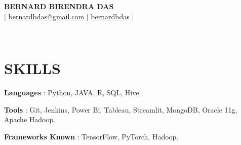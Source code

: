 \documentclass[letterpaper, 10pt]{article}
\begin{document}
\begin{center}
    \textbf{\Large\scshape BERNARD BIRENDRA DAS} \\ \vspace{2pt}
    \small {} $|$ 
    \faEnvelope \hspace{2pt} \href{mailto:bernardbdas@gmail.com}{\color{black} \underline {bernardbdas@gmail.com}} $|$ 
    \faLinkedin \hspace{2pt}\href{www.linkedin.com/in/bernardbdas/} {\color{black} \underline{bernardbdas}} \hspace{1pt} $|$ 
    \address{  Kolkata, West Bengal}\\
\end{center}
\vspace{-15pt}

\section{SKILLS}
\begin{itemize}[leftmargin=0in, label={}]
\vspace{2pt}
    \small{
    \item {
        \textbf{Languages} {: Python, JAVA, R, SQL, Hive.} \vspace{2pt} \\}
    \item {
        \textbf{Tools} {: Git, Jenkins, Power Bi, Tableau, Streamlit, MongoDB, Oracle 11g, Apache Hadoop.}\vspace{2pt} \\}
    \item {
        \textbf{Frameworks Known} {: TensorFlow, PyTorch, Hadoop.}\vspace{2pt} \\}
    }
\end{itemize} 

\end{document}
